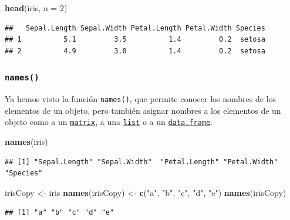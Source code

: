 \documentclass[
]{book}
\newenvironment{Shaded}{\begin{snugshade}}{\end{snugshade}}
\newcommand{\DataTypeTok}[1]{\textcolor[rgb]{0.13,0.29,0.53}{#1}}
\newcommand{\DecValTok}[1]{\textcolor[rgb]{0.00,0.00,0.81}{#1}}
\newcommand{\KeywordTok}[1]{\textcolor[rgb]{0.13,0.29,0.53}{\textbf{#1}}}
\newcommand{\NormalTok}[1]{#1}
\newcommand{\StringTok}[1]{\textcolor[rgb]{0.31,0.60,0.02}{#1}}
\begin{document}
\begin{Shaded}
\begin{Highlighting}[]
\KeywordTok{head}\NormalTok{(iris, }\DataTypeTok{n =} \DecValTok{2}\NormalTok{)}
\end{Highlighting}
\end{Shaded}

\begin{verbatim}
##   Sepal.Length Sepal.Width Petal.Length Petal.Width Species
## 1          5.1         3.5          1.4         0.2  setosa
## 2          4.9         3.0          1.4         0.2  setosa
\end{verbatim}

\hypertarget{l015names}{%
\subsubsection{\texorpdfstring{\texttt{names()}}{names()}}\label{l015names}}

Ya hemos visto la función \texttt{names()}, que permite conocer los nombres de los elementos de un objeto, pero también asignar nombres a los elementos de un objeto como a un \protect\hyperlink{l014matrix}{\texttt{matrix}}, a una \protect\hyperlink{l014list}{\texttt{list}} o a un \protect\hyperlink{l014dataframe}{\texttt{data.frame}}.

\begin{Shaded}
\begin{Highlighting}[]
\KeywordTok{names}\NormalTok{(iris)}
\end{Highlighting}
\end{Shaded}

\begin{verbatim}
## [1] "Sepal.Length" "Sepal.Width"  "Petal.Length" "Petal.Width"  "Species"
\end{verbatim}

\begin{Shaded}
\begin{Highlighting}[]
\NormalTok{irisCopy <-}\StringTok{ }\NormalTok{iris}
\KeywordTok{names}\NormalTok{(irisCopy) <-}\StringTok{ }\KeywordTok{c}\NormalTok{(}\StringTok{"a"}\NormalTok{, }\StringTok{"b"}\NormalTok{, }\StringTok{"c"}\NormalTok{, }\StringTok{"d"}\NormalTok{, }\StringTok{"e"}\NormalTok{)}
\KeywordTok{names}\NormalTok{(irisCopy)}
\end{Highlighting}
\end{Shaded}

\begin{verbatim}
## [1] "a" "b" "c" "d" "e"
\end{verbatim}
\end{document}
